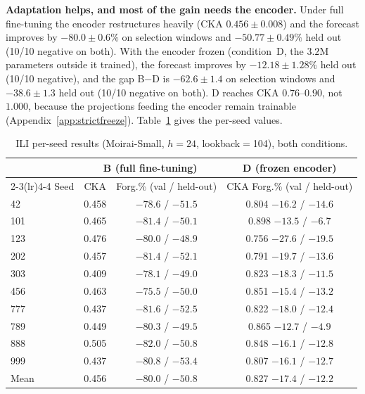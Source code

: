 \textbf{Adaptation helps, and most of the gain needs the encoder.}  Under full
fine-tuning the encoder restructures heavily (CKA $0.456{\pm}0.008$) and the
forecast improves by $-80.0{\pm}0.6\%$ on selection windows and
$-50.77{\pm}0.49\%$ held out (10/10 negative on both).  With the encoder frozen
(condition~D, the $3.2$M parameters outside it trained), the forecast improves by
$-12.18{\pm}1.28\%$ held out (10/10 negative), and the gap B$-$D is
$-62.6{\pm}1.4$ on selection windows and $-38.6{\pm}1.3$ held out (10/10
negative on both).  D reaches CKA $0.76$--$0.90$, not $1.000$, because the
projections feeding the encoder remain trainable (Appendix~\ref{app:strictfreeze}).
Table~\ref{tab:ili_perseed} gives the per-seed values.

\begin{table}[!htbp]
\centering\small
\caption{ILI per-seed results (Moirai-Small, $h{=}24$, lookback$=$104), both
conditions.}
\label{tab:ili_perseed}
\begin{tabular}{@{}lccc@{}}
\toprule
 & \multicolumn{2}{c}{B (full fine-tuning)} & D (frozen encoder) \\
\cmidrule(lr){2-3}\cmidrule(lr){4-4}
Seed & CKA & Forg.\% (val / held-out) & CKA \quad Forg.\% (val / held-out) \\
\midrule
42  & 0.458 & $-78.6$ / $-51.5$ & 0.804 \quad $-16.2$ / $-14.6$ \\
101 & 0.465 & $-81.4$ / $-50.1$ & 0.898 \quad $-13.5$ / $-6.7$ \\
123 & 0.476 & $-80.0$ / $-48.9$ & 0.756 \quad $-27.6$ / $-19.5$ \\
202 & 0.457 & $-81.4$ / $-52.1$ & 0.791 \quad $-19.7$ / $-13.6$ \\
303 & 0.409 & $-78.1$ / $-49.0$ & 0.823 \quad $-18.3$ / $-11.5$ \\
456 & 0.463 & $-75.5$ / $-50.0$ & 0.851 \quad $-15.4$ / $-13.2$ \\
777 & 0.437 & $-81.6$ / $-52.5$ & 0.822 \quad $-18.0$ / $-12.4$ \\
789 & 0.449 & $-80.3$ / $-49.5$ & 0.865 \quad $-12.7$ / $-4.9$ \\
888 & 0.505 & $-82.0$ / $-50.8$ & 0.848 \quad $-16.1$ / $-12.8$ \\
999 & 0.437 & $-80.8$ / $-53.4$ & 0.807 \quad $-16.1$ / $-12.7$ \\
\midrule
Mean & 0.456 & $-80.0$ / $-50.8$ & 0.827 \quad $-17.4$ / $-12.2$ \\
\bottomrule
\end{tabular}
\end{table}

